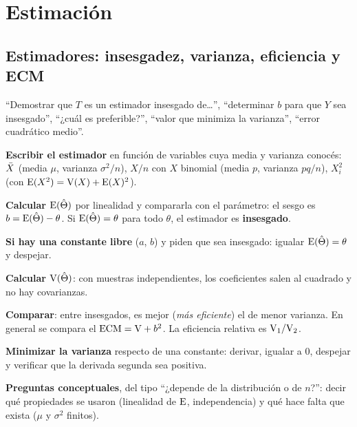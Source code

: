 \newpage
\section{Estimación}

\subsection{Estimadores: insesgadez, varianza, eficiencia y ECM}\label{p:estim}
\begin{cuando}
``Demostrar que $T$ es un estimador insesgado de\ldots'', ``determinar $b$ para que $Y$ sea insesgado'', ``¿cuál es preferible?'', ``valor que minimiza la varianza'', ``error cuadrático medio''.
\end{cuando}
\begin{pasos}
\begin{pasolista}
\item \textbf{Escribir el estimador} en función de variables cuya media y varianza conocés: $\bar{X}$ (media $\mu$, varianza $\sigma^2/n$), $X/n$ con $X$ binomial (media $p$, varianza $pq/n$), $X_i^2$ (con $\mathrm{E}(X^2)=\mathrm{V}(X)+\mathrm{E}(X)^2$).
\item \textbf{Calcular $\mathrm{E}(\hat\Theta)$} por linealidad y compararla con el parámetro: el sesgo es $b=\mathrm{E}(\hat\Theta)-\theta$. Si $\mathrm{E}(\hat\Theta)=\theta$ para todo $\theta$, el estimador es \textbf{insesgado}.
\item \textbf{Si hay una constante libre} ($a$, $b$) y piden que sea insesgado: igualar $\mathrm{E}(\hat\Theta)=\theta$ y despejar.
\item \textbf{Calcular $\mathrm{V}(\hat\Theta)$}: con muestras independientes, los coeficientes salen al cuadrado y no hay covarianzas.
\item \textbf{Comparar}: entre insesgados, es mejor (\emph{más eficiente}) el de menor varianza. En general se compara el $\mathrm{ECM}=\mathrm{V}+b^2$. La eficiencia relativa es $\mathrm{V}_1/\mathrm{V}_2$.
\item \textbf{Minimizar la varianza} respecto de una constante: derivar, igualar a 0, despejar y verificar que la derivada segunda sea positiva.
\item \textbf{Preguntas conceptuales}, del tipo ``¿depende de la distribución o de $n$?'': decir qué propiedades se usaron (linealidad de $\mathrm{E}$, independencia) y qué hace falta que exista ($\mu$ y $\sigma^2$ finitos).
\end{pasolista}
\end{pasos}
